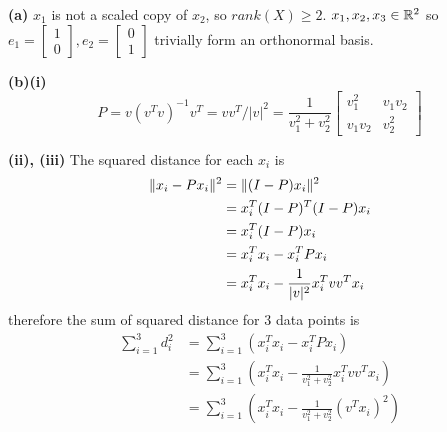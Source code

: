 \documentclass[a4paper, 12pt]{article}
\begin{document}
\begin{problem} [Problem 2]
\end{problem}
\begin{solution}
    \textbf{(a)} $x_1$ is not a scaled copy of $x_2$, so $rank(X) \geq 2$. $x_1, x_2, x_3 \in \mathbb{R}^2$ so $e_1 = \begin{bmatrix}
            1 \\ 0
        \end{bmatrix}, e_2 = \begin{bmatrix}
            0 \\1
        \end{bmatrix}$ trivially form an orthonormal basis.

    \textbf{(b)(i)} \[
        P = v(v^T v)^{-1}v^T = vv^T/|v|^2 = \frac{1}{v_1^2 + v_2^2}\begin{bmatrix}
            v_1^2  & v_1v_2 \\
            v_1v_2 & v_2^2
        \end{bmatrix}
    \]

    \textbf{(ii), (iii)}
    The squared distance for each $x_i$ is
    \begin{align*}
        \lVert x_i - Px_i\rVert^2 & = \lVert(I-P)x_i\rVert^2                            \\
                            & = x_i^T (I-P)^T (I-P) x_i                      \\
                            & = x_i^T (I-P) x_i                              \\
                            & = x_i^T x_i - x_i^T P x_i                      \\
                            & = x_i^T x_i - \frac{1}{|v|^2}  x_i^T v v^T x_i
    \end{align*}
    therefore the sum of squared distance for 3 data points is
    \begin{align*}
        \sum_{i=1}^{3} d_i^2 & = \sum_{i=1}^{3} \left(x_i^T x_i - x_i^T P x_i\right)                             \\
                             & = \sum_{i=1}^{3} \left(x_i^T x_i - \frac{1}{v_1^2 + v_2^2} x_i^T v v^T x_i\right) \\
                             & = \sum_{i=1}^{3} \left(x_i^T x_i - \frac{1}{v_1^2 + v_2^2} (v^T x_i)^2\right)
    \end{align*}


\end{solution}
\end{document}
